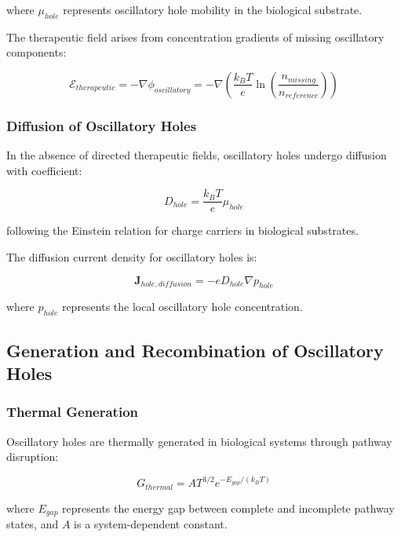 \documentclass[12pt,a4paper]{article}
\begin{document}
where $\mu_{hole}$ represents oscillatory hole mobility in the biological substrate.

The therapeutic field arises from concentration gradients of missing oscillatory components:

\begin{equation}
\mathcal{E}_{therapeutic} = -\nabla \phi_{oscillatory} = -\nabla \left(\frac{k_B T}{e} \ln\left(\frac{n_{missing}}{n_{reference}}\right)\right)
\end{equation}

\subsubsection{Diffusion of Oscillatory Holes}

In the absence of directed therapeutic fields, oscillatory holes undergo diffusion with coefficient:

\begin{equation}
D_{hole} = \frac{k_B T}{e} \mu_{hole}
\end{equation}

following the Einstein relation for charge carriers in biological substrates.

The diffusion current density for oscillatory holes is:

\begin{equation}
\mathbf{J}_{hole,diffusion} = -e D_{hole} \nabla p_{hole}
\end{equation}

where $p_{hole}$ represents the local oscillatory hole concentration.

\subsection{Generation and Recombination of Oscillatory Holes}

\subsubsection{Thermal Generation}

Oscillatory holes are thermally generated in biological systems through pathway disruption:

\begin{equation}
G_{thermal} = A T^{3/2} e^{-E_{gap}/(k_B T)}
\end{equation}

where $E_{gap}$ represents the energy gap between complete and incomplete pathway states, and $A$ is a system-dependent constant.
\end{document}
